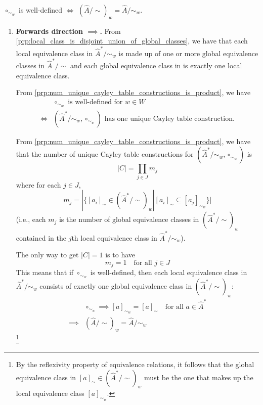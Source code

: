 \begin{propositionE}
    \label{prp:circ_sim_w_is_well_defined_iff_global_sim_coincides_with_local_sim}
    $\circ_{\sim_{w}}$ is well-defined $\iff$ $(\hat{A}/\sim)_{w} = \hat{A}/\sim_{w}$.
\end{propositionE}
\begin{proofE}
\begin{enumerate}
    \item \textbf{Forwards direction $\implies$.}
    From \cref{prp:local_class_is_disjoint_union_of_global_classes}, we have that each local equivalence class in $\hat{A}^{*}/\sim_{w}$ is made up of one or more global equivalence classes in $\hat{A}^{*}/\sim$ and each global equivalence class in is exactly one local equivalence class.

    From \cref{prp:num_unique_cayley_table_constructions_is_product}, we have
    \begin{align}
        & \text{$\circ_{\sim_{w}}$ is well-defined for $w \in W$} \\
        \iff & \text{$( \hat{A}^{*}/\sim_{w}, \circ_{\sim_{w}})$ has one unique Cayley table construction.}
    \end{align}

    From \cref{prp:num_unique_cayley_table_constructions_is_product}, we have that the number of unique Cayley table constructions for $(\hat{A}^{*}/\sim_{w}, \circ_{\sim_{w}})$ is
    \begin{equation}
        |C| = \prod_{j \in J} m_{j}
    \end{equation}
    where for each $j \in J$,
    \begin{equation}
        m_{j} = |\{ [a_{i}]_{\sim} \in (\hat{A}^{*}/\sim)_{w} | [a_{i}]_{\sim} \subseteq [a_{j}]_{\sim_{w}} \}|
    \end{equation}
    (i.e., each $m_{j}$ is the number of global equivalence classes in $(\hat{A}^{*}/\sim)_{w}$ contained in the $j$th local equivalence class in $\hat{A}^{*}/\sim_{w}$).
    
    The only way to get $|C| = 1$ is to have
    \begin{equation}
        m_{j} = 1 \quad \text{for all $j \in J$}
    \end{equation}
    This means that if $\circ_{\sim_{w}}$ is well-defined, then each local equivalence class in $\hat{A}^{*}/\sim_{w}$ consists of exactly one global equivalence class in $(\hat{A}^{*}/\sim)_{w}$:
    \begin{align}
        & \circ_{\sim_{w}} \implies [a]_{\sim_{w}} = [a]_{\sim} \quad \text{for all $a \in \hat{A}^{*}$} \\
        \implies & (\hat{A}/\sim)_{w} = \hat{A}/\sim_{w}
    \end{align}
    \footnote{
    By the reflexivity property of equivalence relations, it follows that the global equivalence class in $[a]_{\sim}\in (\hat{A}^{*}/\sim)_{w}$ must be the one that makes up the local equivalence class $[a]_{\sim_{w}}$.
    }


\end{enumerate}
\end{proofE}

